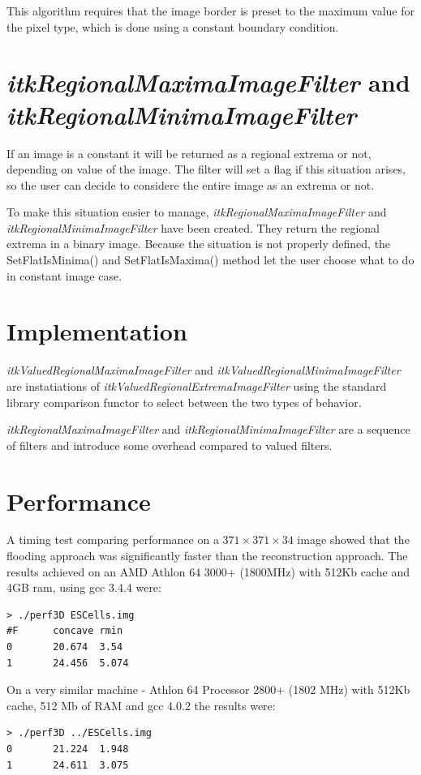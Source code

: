 \documentclass{llncs}
\begin{document}
This algorithm requires that the image border is preset to the maximum
value for the pixel type, which is done using a constant boundary
condition.

\section{{\em itkRegionalMaximaImageFilter} and {\em itkRegionalMinimaImageFilter}}
If an image is a constant it will be returned as a regional extrema or not,
depending on value of the image. The filter will set a flag if
this situation arises, so the user can decide to considere the entire image as an
extrema or not.

To make this situation easier to manage, {\em itkRegionalMaximaImageFilter} and
{\em itkRegionalMinimaImageFilter} have been created. They return the regional
extrema in a binary image. Because the situation is not properly defined, the 
SetFlatIsMinima() and SetFlatIsMaxima() method let the user choose what to do
in constant image case.

\section{Implementation}
{\em itkValuedRegionalMaximaImageFilter} and {\em
itkValuedRegionalMinimaImageFilter} are instatiations of {\em
itkValuedRegionalExtremaImageFilter} using the standard library
comparison functor to select between the two types of behavior.

{\em itkRegionalMaximaImageFilter} and {\em itkRegionalMinimaImageFilter} are a sequence
of filters and introduce some overhead compared to valued filters.

\section{Performance}
A timing test comparing performance on a $371 \times 371 \times 34$
image showed that the flooding approach was significantly faster than
the reconstruction approach. The results achieved on an AMD Athlon 64
3000+ (1800MHz) with 512Kb cache and 4GB ram, using gcc 3.4.4 were:
\begin{verbatim}
> ./perf3D ESCells.img
#F      concave rmin
0       20.674  3.54
1       24.456  5.074
\end{verbatim}
On a very similar machine - Athlon 64 Processor 2800+ (1802
MHz) with 512Kb cache, 512 Mb of RAM and gcc 4.0.2 the results were:
\begin{verbatim}
> ./perf3D ../ESCells.img
0       21.224  1.948
1       24.611  3.075
\end{verbatim}
\end{document}
